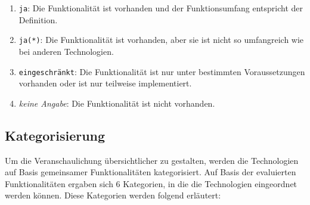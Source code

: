 \begin{enumerate}
	\item \texttt{ja}: Die Funktionalität ist vorhanden und der Funktionsumfang entspricht der Definition.
	\item \texttt{ja(*)}: Die Funktionalität ist vorhanden, aber sie ist nicht so umfangreich wie bei anderen Technologien.
	\item \texttt{eingeschränkt}: Die Funktionalität ist nur unter bestimmten Voraussetzungen vorhanden oder ist nur teilweise implementiert.
	\item \textit{keine Angabe}: Die Funktionalität ist nicht vorhanden.
\end{enumerate}



\subsection{Kategorisierung}

Um die Veranschaulichung übersichtlicher zu gestalten, werden die Technologien auf Basis gemeinsamer Funktionalitäten kategorisiert. Auf Basis der evaluierten Funktionalitäten ergaben sich 6 Kategorien, in die die Technologien eingeordnet werden können. Diese Kategorien werden folgend erläutert:

\pagebreak

